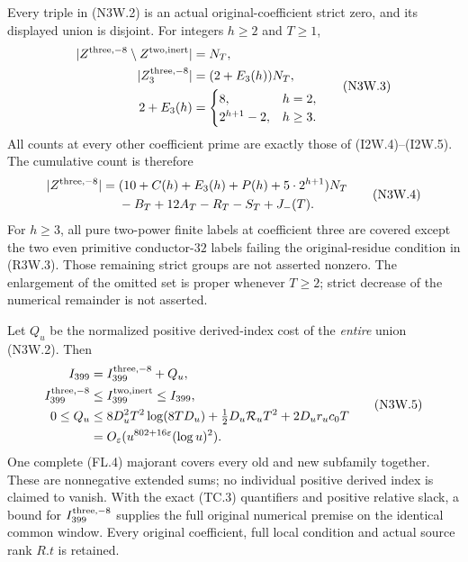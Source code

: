 \begin{theorem}
\label{AC-G188-window}
Every triple in (N3W.2) is an actual original-coefficient strict zero,
and its displayed union is disjoint. For integers $h\geq2$ and $T\geq1$,
\[
 \begin{aligned}
 |Z^{\rm three,-8}\setminus Z^{\rm two,inert}|&=N_T,\\
 |Z^{\rm three,-8}_3|&=(2+E_3(h))N_T,\\
 2+E_3(h)&=
 \begin{cases}8,&h=2,\\2^{h+1}-2,&h\geq3.
 \end{cases}
 \end{aligned}\tag{N3W.3}
\]
All counts at every other coefficient prime are exactly those of
(I2W.4)--(I2W.5). The cumulative count is therefore
\[
 \begin{split}
 |Z^{\rm three,-8}|={}&
 (10+C(h)+E_3(h)+P(h)+5\cdot2^{h+1})N_T\\
 &-B_T+12A_T-R_T-S_T+J_-(T).
 \end{split}\tag{N3W.4}
\]
For $h\geq3$, all pure two-power finite labels at coefficient three
are covered except the two even primitive conductor-$32$ labels
failing the original-residue condition in (R3W.3).
Those remaining strict groups are not asserted nonzero.
The enlargement of the omitted set is proper whenever $T\geq2$;
strict decrease of the numerical remainder is not asserted.

Let $Q_u$ be the normalized positive derived-index cost of the
\emph{entire} union (N3W.2). Then
\[
 \begin{aligned}
 I_{399}&=I_{399}^{\rm three,-8}+Q_u,\\
 I_{399}^{\rm three,-8}&\leq I_{399}^{\rm two,inert}\leq I_{399},\\
 0\leq Q_u&\leq8D_u^2T^2\log(8TD_u)
      +\tfrac12D_u\mathcal R_uT^2+2D_ur_uc_0T\\
 &=O_\varepsilon(u^{802+16\varepsilon}(\log u)^2).
 \end{aligned}\tag{N3W.5}
\]
One complete (FL.4) majorant covers every old and new subfamily
together. These are nonnegative extended sums; no individual
positive derived index is claimed to vanish. With the exact
(TC.3) quantifiers and positive relative slack, a bound for
$I_{399}^{\rm three,-8}$ supplies the full original numerical
premise on the identical common window. Every original coefficient,
full local condition and actual source rank $R.t$ is retained.
\end{theorem}

